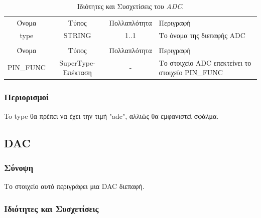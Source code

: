 \begin{table}[H]
	\begin{center}
		\begin{tabular}{ | c | c | c| m{5.5cm} | }
			\hline
			\rowcolor{Gray}
			\multicolumn{4}{|c|}{\textbf{Ιδιότητες}}\\
			\hline
			\rowcolor{Gray}
			Όνομα & Τύπος & Πολλαπλότητα & Περιγραφή \\
			\hline
			type & STRING & 1..1 & Το όνομα της διεπαφής ADC \\
			\hline
			\rowcolor{Gray}
			\multicolumn{4}{|c|}{\textbf{Συσχετίσεις}}\\
			\hline
			\rowcolor{Gray}
			Όνομα & Τύπος & Πολλαπλότητα & Περιγραφή \\
			\hline
			PIN\_FUNC & SuperType-Επέκταση & - &  Το στοιχείο ADC επεκτείνει το στοιχείο PIN\_FUNC \\
			\hline
		\end{tabular}
		\caption{Ιδιότητες και Συσχετίσεις του \textit{ADC}.}
		\label{tab:adc}
	\end{center}
\end{table}

\subsubsection*{Περιορισμοί}

\noindent To type θα πρέπει να έχει την τιμή "adc", αλλιώς θα εμφανιστεί σφάλμα.

\subsection{DAC}
\label{subsec:dac}

\subsubsection*{Σύνοψη}

\noindent Το στοιχείο αυτό περιγράφει μια DAC διεπαφή.

\subsubsection*{Ιδιότητες και Συσχετίσεις}

